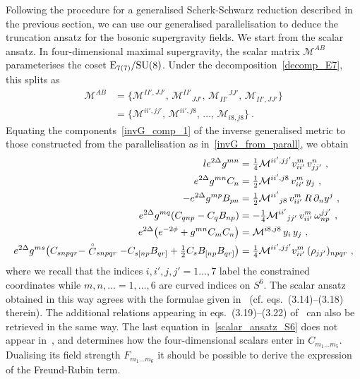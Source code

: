 \documentclass[debug]{phd}
\begin{document}
					Following the procedure for a generalised Scherk-Schwarz reduction described in the previous section, we can use our generalised parallelisation to deduce the truncation ansatz for the bosonic supergravity fields. 
					We start from the scalar ansatz. 
					In four-dimensional maximal supergravity, the scalar matrix $\mathcal{M}^{AB}$ parameterises the coset $\mathrm{E}_{7(7)}/\mathrm{SU}(8)$. 
					Under the decomposition~\eqref{decomp_E7}, this splits as 
							\begin{equation}
								\begin{split}
									\mathcal{M}^{AB} &= \{ \mathcal{M}^{II',JJ'}, \, \mathcal{M}^{II'}{}_{JJ'} ,\,\mathcal{M}_{II'}{}^{JJ'} ,\,\mathcal{M}_{II',JJ'}\} \\
												& = \{ \mathcal{M}^{ii',jj'}, \, \mathcal{M}^{ii',j8},\, \ldots ,\,\mathcal{M}_{i8,j8}\}\ .
								\end{split}
							\end{equation}
					Equating the components~\eqref{invG_comp_1} of the inverse generalised metric to those constructed from the parallelisation as in~\eqref{invG_from_parall}, we obtain
							\begin{equation}\label{scalar_ansatz_S6}
								\begin{aligned}{l}
									e^{2\Delta} g^{mn} &= \tfrac{1}{4}\mathcal{M}^{ii',jj'} v^m_{ii'}\, v^n_{jj'}\ , \\
									e^{2\Delta} g^{mn}C_n &= \tfrac{1}{2}\mathcal{M}^{ii',j8}\, v^m_{ii'}\,y_{j}\ , \\
									-e^{2\Delta} g^{mp}B_{pn} &= \tfrac{1}{2} \mathcal{M}^{ii'}{}_{j8}\, v^m_{ii'}\,R\, \partial_n y^{j}\ , \\
									e^{2\Delta}g^{mq}\left(C_{qnp} - C_{q}B_{np} \right) &= - \tfrac{1}{4}\mathcal{M}^{ii'}{}_{jj'}\, v^{m}_{ii'}\, \omega^{jj'}_{np}\ , \\
									e^{2\Delta}\left( e^{-2\phi} + g^{mn}C_m C_n\right) &= \mathcal{M}^{i8,j8}\, y_i\, y_j \ ,\\
									{e}^{2\Delta}g^{ms}\big(C_{snpqr} - \rg{C}_{snpqr} -C_{s[np}B_{qr]} + \tfrac{1}{2}C_s B_{[np}B_{qr]}\big) &=\tfrac{1}{4} \mathcal{M}^{ii',jj'} v^{m}_{ii'}\, (\rho_{jj'})_{npqr} \ ,
								\end{aligned}
							\end{equation}
					where we recall that the indices $i,i',j,j' =1\ldots, 7$ label the constrained coordinates while $m,n,\ldots=1,\ldots,6$ are curved indices on $S^6$.
					The scalar ansatz obtained in this way agrees with the formulae given in~\cite{Guarino:2015vca} (cf. eqs.~(3.14)--(3.18) therein). 
					The additional relations appearing in eqs.~(3.19)--(3.22) of~\cite{Guarino:2015vca} can also be retrieved in the same way. 
					The last equation in~\eqref{scalar_ansatz_S6} does not appear in~\cite{Guarino:2015vca}, and determines how the four-dimensional scalars enter in $C_{m_1\ldots m_5}$. 
					Dualising its field strength $F_{m_1\ldots m_6}$ it should be possible to derive the expression of the Freund-Rubin term.
\end{document}
